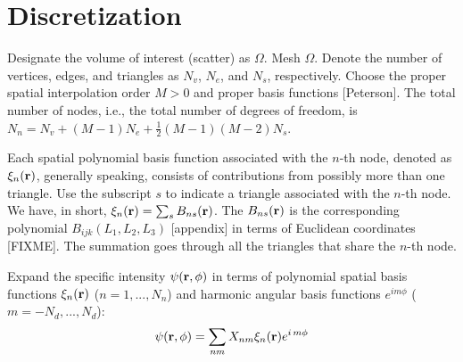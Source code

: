 \documentclass[main]{subfiles}
\begin{document}
\section{Discretization}
\label{sec:discretization}
Designate the volume of interest (scatter) as $\Omega$. Mesh $\Omega$. Denote 
the number of vertices, edges, and triangles as $N_v$, $N_e$, and $N_s$, 
respectively. Choose the proper spatial interpolation order $M>0$ and proper 
basis functions [Peterson]. The total number of nodes, i.e., the total number 
of degrees of freedom, is $N_n=N_v+(M-1)N_e+\frac{1}{2}(M-1)(M-2)N_s$.

Each spatial polynomial basis function associated with the $n$-th node, denoted
as $\xi_n(\mathbf{r})$, generally speaking, consists of contributions from possibly
more than one triangle. Use the subscript $s$ to indicate a triangle associated 
with the $n$-th node. We have, in short, $\xi_n(\mathbf{r})=\sum\nolimits_s
B_{ns}(\mathbf{r})$. The $B_{ns}(\mathbf{r})$ is the corresponding polynomial 
$B_{ijk}(L_1,L_2,L_3)$ [appendix] in terms of Euclidean coordinates [FIXME]. The
summation goes through all the triangles that share the $n$-th node.

Expand the specific intensity $\psi(\mathbf{r},\phi)$ in terms of polynomial spatial 
basis functions $\xi_n(\mathbf{r})$ ($n=1,...,N_n$) and harmonic angular basis 
functions $e^{i m \phi}$ ($m=-N_d,...,N_d$):
\begin{equation} \label{expansion of psi}
	\psi(\mathbf{r},\phi)=\sum\limits_{nm}
	X_{nm}\xi_n(\mathbf{r})e^{i\,m\phi}
\end{equation}
\end{document}
